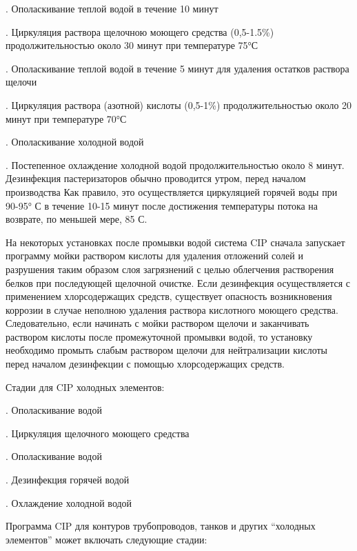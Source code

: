 {\par {}. Ополаскивание теплой водой в течение 10 минут
\par {}. Циркуляция раствора щелочною моющего средства (0,5-1.5\%) продолжительностью около 30 минут при температуре 75°С
\par {}. Ополаскивание теплой водой в течение 5 минут для удаления остатков раствора щелочи
\par {}. Циркуляция раствора (азотной) кислоты (0,5-1\%) продолжительностью около 20 минут при температуре 70°С
\par {}. Ополаскивание холодной водой
\par {}.  Постепенное охлаждение холодной водой продолжительностью около 8 минут. Дезинфекция пастеризаторов обычно проводится утром, перед началом производства Как правило, это осуществляется циркуляцией горячей воды при 90-95° С в течение 10-15 минут после достижения температуры потока на возврате, по меньшей мере, 85 С.

\par \redline На некоторых установках после промывки водой система CIP сначала запускает программу мойки раствором кислоты для удаления отложений солей и разрушения таким образом слоя загрязнений с целью облегчения растворения белков при последующей щелочной очистке. Если дезинфекция осуществляется с применением хлорсодержащих средств, существует опасность возникновения коррозии в случае неполною удаления раствора кислотного моющего средства. Следовательно, если начинать с мойки раствором щелочи и заканчивать раствором кислоты после промежуточной промывки водой, то установку необходимо промыть слабым раствором щелочи для нейтрализации кислоты перед началом дезинфекции с помощью хлорсодержащих средств.

\par \redline Стадии для CIP холодных элементов:

\par {}. Ополаскивание водой
\par {}. Циркуляция щелочного моющего средства
\par {}. Ополаскивание водой
\par {}. Дезинфекция горячей водой
\par {}. Охлаждение холодной водой

\par \redline Программа CIP для контуров трубопроводов, танков и других “холодных элементов” может включать следующие стадии:

}
